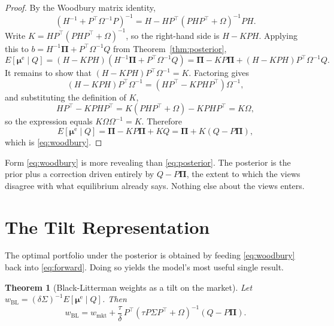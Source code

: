\documentclass[11pt]{article}
\newtheorem{theorem}{Theorem}
\theoremstyle{remark}
\theoremstyle{definition}
\begin{document}
\begin{proof}
By the Woodbury matrix identity,
\begin{equation*}
\left(H^{-1} + P^\top\Omega^{-1}P\right)^{-1} = H - HP^\top\left(PHP^\top + \Omega\right)^{-1}PH.
\end{equation*}
Write $K = HP^\top(PHP^\top+\Omega)^{-1}$, so the right-hand side is $H - KPH$. Applying this to $b = H^{-1}\boldsymbol\Pi + P^\top\Omega^{-1}Q$ from Theorem~\ref{thm:posterior},
\begin{equation*}
E[\boldsymbol\mu^{\mathrm{e}}\mid Q] = (H - KPH)\left(H^{-1}\boldsymbol\Pi + P^\top\Omega^{-1}Q\right) = \boldsymbol\Pi - KP\boldsymbol\Pi + (H - KPH)P^\top\Omega^{-1}Q.
\end{equation*}
It remains to show that $(H - KPH)P^\top\Omega^{-1} = K$. Factoring gives
\begin{equation*}
(H-KPH)P^\top\Omega^{-1} = \left(HP^\top - KPHP^\top\right)\Omega^{-1},
\end{equation*}
and substituting the definition of $K$,
\begin{equation*}
HP^\top - KPHP^\top = K\left(PHP^\top+\Omega\right) - KPHP^\top = K\Omega,
\end{equation*}
so the expression equals $K\Omega\Omega^{-1} = K$. Therefore
\begin{equation*}
E[\boldsymbol\mu^{\mathrm{e}}\mid Q] = \boldsymbol\Pi - KP\boldsymbol\Pi + KQ
 = \boldsymbol\Pi + K(Q - P\boldsymbol\Pi),
\end{equation*}
which is \eqref{eq:woodbury}.
\end{proof}

Form \eqref{eq:woodbury} is more revealing than \eqref{eq:posterior}. The posterior is the prior plus a correction driven entirely by $Q - P\boldsymbol\Pi$, the extent to which the views disagree with what equilibrium already says. Nothing else about the views enters.

\section{The Tilt Representation}
\label{sec:tilt}

The optimal portfolio under the posterior is obtained by feeding \eqref{eq:woodbury} back into \eqref{eq:forward}. Doing so yields the model's most useful single result.

\begin{theorem}[Black-Litterman weights as a tilt on the market]
\label{thm:tilt}
Let $w_{\mathrm{BL}} = (\delta\Sigma)^{-1}E[\boldsymbol\mu^{\mathrm{e}}\mid Q]$. Then
\begin{equation}
\label{eq:tilt}
w_{\mathrm{BL}} = w_{\mathrm{mkt}} + \frac{\tau}{\delta}\,P^\top\left(\tau P\Sigma P^\top + \Omega\right)^{-1}\left(Q - P\boldsymbol\Pi\right).
\end{equation}
\end{theorem}
\end{document}
